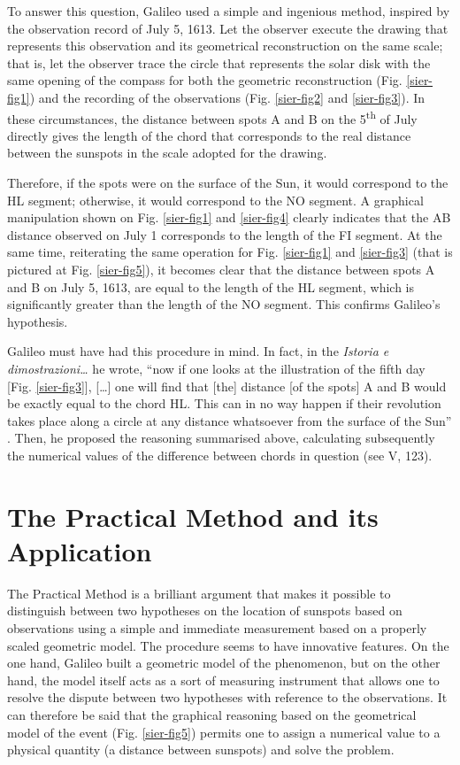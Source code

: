 \begin{artengenv}
To answer this question, Galileo used a simple and ingenious method, inspired by the observation record of July 5, 1613.
Let the observer execute the drawing that represents this observation and its geometrical reconstruction on the same
scale; that is, let the observer trace the circle that represents the solar disk with the same opening of the compass
for both the geometric reconstruction (Fig. \ref{sier-fig1}) and the recording of the observations (Fig. \ref{sier-fig2} and \ref{sier-fig3}). In these
circumstances, the distance between spots A and B on the 5\textsuperscript{th} of July directly gives the length of the chord that corresponds to
the real distance between the sunspots in the scale adopted for the drawing. 

Therefore, if the spots were on the surface of the Sun, it would correspond to the HL segment; otherwise, it would
correspond to the NO segment. A graphical manipulation shown on Fig. \ref{sier-fig1} and \ref{sier-fig4} clearly indicates that the AB distance
observed on July 1 corresponds to the length of the FI segment. At the same time, reiterating the same operation for
Fig. \ref{sier-fig1} and \ref{sier-fig3} (that is pictured at Fig. \ref{sier-fig5}), it becomes clear that the distance between spots A and B on July 5, 1613, are
equal to the length of the HL segment, which is significantly greater than the length of the NO segment. This confirms
Galileo’s hypothesis.

Galileo must have had this procedure in mind. In fact, in the \textit{Istoria e dimostrazioni\ldots} he wrote, ``now if one
looks at the illustration of the fifth day [Fig. \ref{sier-fig3}], [\ldots] one will find that [the] distance [of the spots] A and B would
be exactly equal to the chord HL. This can in no way happen if their revolution takes place along a circle at any
distance whatsoever from the surface of the Sun''
\parencite[see  V, 122.34-36;][p.115]{galilei_sunspots_2010}.
Then, he proposed the reasoning summarised above, calculating subsequently the numerical values of the difference
between chords in question (see  V, 123).

\section{The Practical Method and its Application}

The Practical Method is a brilliant argument that makes it possible to distinguish between two hypotheses on the
location of sunspots based on observations using a simple and immediate measurement based on a properly scaled
geometric model. The procedure seems to have innovative features. On the one hand, Galileo built a geometric model of
the phenomenon, but on the other hand, the model itself acts as a sort of measuring instrument that allows one to
resolve the dispute between two hypotheses with reference to the observations. It can therefore be said that the
graphical reasoning based on the geometrical model of the event (Fig. \ref{sier-fig5}) permits one to assign a numerical value to a
physical quantity (a distance between sunspots) and solve the problem.


\end{artengenv}
